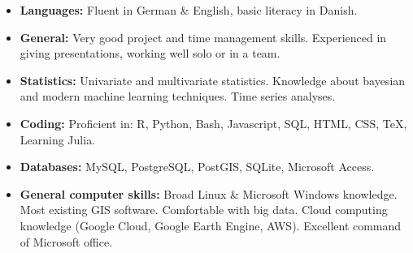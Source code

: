 \documentclass[12pt,a4paper,roman]{moderncv}        %
\begin{document}
\begin{itemize}

\item \textbf{Languages:} Fluent in German \& English, basic literacy in Danish.
\item \textbf{General:} Very good project and time management skills. Experienced in giving presentations, working well solo or in a team.
\item \textbf{Statistics:} Univariate and multivariate statistics. Knowledge about bayesian and modern machine learning techniques. Time series analyses.
\item \textbf{Coding:} Proficient in: R, Python, Bash, Javascript, SQL, HTML, CSS, TeX, Learning Julia.
\item \textbf{Databases:} MySQL, PostgreSQL, PostGIS, SQLite, Microsoft Access.
\item \textbf{General computer skills:} Broad Linux \& Microsoft Windows knowledge. Most existing GIS software. Comfortable with big data. Cloud computing knowledge (Google Cloud, Google Earth Engine, AWS). Excellent command of Microsoft office.

\end{itemize}


\end{document}
